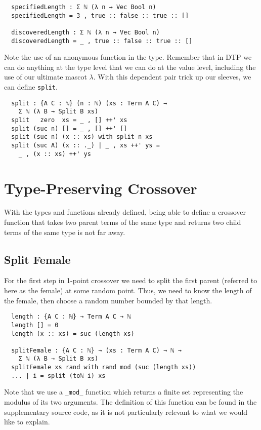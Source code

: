 \documentclass{acm_proc_article-sp}
\begin{document}
\begin{verbatim}
  specifiedLength : Σ ℕ (λ n → Vec Bool n)
  specifiedLength = 3 , true :: false :: true :: []

  discoveredLength : Σ ℕ (λ n → Vec Bool n)
  discoveredLength = _ , true :: false :: true :: []
\end{verbatim}

Note the use of an anonymous function in the type. Remember that in DTP
we can do anything at the type level that we can do at the value
level, including the use of our ultimate mascot $\lambda$. With this
dependent pair trick up our sleeves, we can define \texttt{split}.

\begin{verbatim}
  split : {A C : ℕ} (n : ℕ) (xs : Term A C) →
    Σ ℕ (λ B → Split B xs)
  split   zero  xs = _ , [] ++' xs
  split (suc n) [] = _ , [] ++' []
  split (suc n) (x :: xs) with split n xs
  split (suc A) (x :: ._) | _ , xs ++' ys =
    _ , (x :: xs) ++' ys
\end{verbatim}

\section{Type-Preserving Crossover}

With the types and functions already defined, being able to define a
crossover function that takes two parent terms of the same type and
returns two child terms of the same type is not far away.

\subsection{Split Female}

For the first step in 1-point crossover we need to split the first
parent (referred to here as the female) at some random point. Thus, we
need to know the length of the female, then choose a random number
bounded by that length.

\begin{verbatim}
  length : {A C : ℕ} → Term A C → ℕ
  length [] = 0
  length (x :: xs) = suc (length xs)

  splitFemale : {A C : ℕ} → (xs : Term A C) → ℕ →
    Σ ℕ (λ B → Split B xs)
  splitFemale xs rand with rand mod (suc (length xs))
  ... | i = split (toℕ i) xs
\end{verbatim}

Note that we use a \texttt{\_mod\_} function which returns a finite set
representing the modulus of its two arguments. The definition of this
function can be found in the supplementary source code, as it is not
particularly relevant to what we would like to explain.
\end{document}
